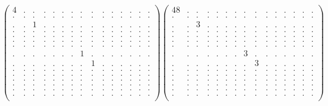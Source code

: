 \documentclass[12pt,a4paper]{amsart}
\begin{document}
\begin{align*}
\left(\begin{array}{rrrrrrrrrrrrrrr}%
4&.&.&.&.&.&.&.&.&.&.&.&.&.&.\\%
.&.&.&.&.&.&.&.&.&.&.&.&.&.&.\\%
.&.&1&.&.&.&.&.&.&.&.&.&.&.&.\\%
.&.&.&.&.&.&.&.&.&.&.&.&.&.&.\\%
.&.&.&.&.&.&.&.&.&.&.&.&.&.&.\\%
.&.&.&.&.&.&.&.&.&.&.&.&.&.&.\\%
.&.&.&.&.&.&.&.&.&.&.&.&.&.&.\\%
.&.&.&.&.&.&.&1&.&.&.&.&.&.&.\\%
.&.&.&.&.&.&.&.&1&.&.&.&.&.&.\\%
.&.&.&.&.&.&.&.&.&.&.&.&.&.&.\\%
.&.&.&.&.&.&.&.&.&.&.&.&.&.&.\\%
.&.&.&.&.&.&.&.&.&.&.&.&.&.&.\\%
.&.&.&.&.&.&.&.&.&.&.&.&.&.&.\\%
.&.&.&.&.&.&.&.&.&.&.&.&.&.&.\\%
.&.&.&.&.&.&.&.&.&.&.&.&.&.&.\\%
\end{array}\right)%
\left(\begin{array}{rrrrrrrrrrrrrrr}%
48&.&.&.&.&.&.&.&.&.&.&.&.&.&.\\%
.&.&.&.&.&.&.&.&.&.&.&.&.&.&.\\%
.&.&3&.&.&.&.&.&.&.&.&.&.&.&.\\%
.&.&.&.&.&.&.&.&.&.&.&.&.&.&.\\%
.&.&.&.&.&.&.&.&.&.&.&.&.&.&.\\%
.&.&.&.&.&.&.&.&.&.&.&.&.&.&.\\%
.&.&.&.&.&.&.&.&.&.&.&.&.&.&.\\%
.&.&.&.&.&.&.&3&.&.&.&.&.&.&.\\%
.&.&.&.&.&.&.&.&3&.&.&.&.&.&.\\%
.&.&.&.&.&.&.&.&.&.&.&.&.&.&.\\%
.&.&.&.&.&.&.&.&.&.&.&.&.&.&.\\%
.&.&.&.&.&.&.&.&.&.&.&.&.&.&.\\%
.&.&.&.&.&.&.&.&.&.&.&.&.&.&.\\%
.&.&.&.&.&.&.&.&.&.&.&.&.&.&.\\%
.&.&.&.&.&.&.&.&.&.&.&.&.&.&.\\%
\end{array}\right)%
\end{align*}
\end{document}
